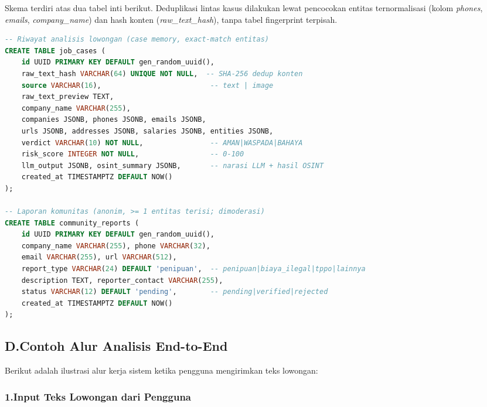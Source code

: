 \documentclass[12pt,a4paper]{article}
\begin{document}
Skema terdiri atas dua tabel inti berikut. Deduplikasi lintas kasus dilakukan lewat pencocokan
entitas ternormalisasi (kolom \textit{phones}, \textit{emails}, \textit{company\_name}) dan hash
konten (\textit{raw\_text\_hash}), tanpa tabel fingerprint terpisah.

\begin{adjustwidth}{0.50cm}{0pt}
\begin{lstlisting}[language=SQL, caption={DDL dua tabel inti Verifin (ringkas)}]
-- Riwayat analisis lowongan (case memory, exact-match entitas)
CREATE TABLE job_cases (
    id UUID PRIMARY KEY DEFAULT gen_random_uuid(),
    raw_text_hash VARCHAR(64) UNIQUE NOT NULL,  -- SHA-256 dedup konten
    source VARCHAR(16),                          -- text | image
    raw_text_preview TEXT,
    company_name VARCHAR(255),
    companies JSONB, phones JSONB, emails JSONB,
    urls JSONB, addresses JSONB, salaries JSONB, entities JSONB,
    verdict VARCHAR(10) NOT NULL,                -- AMAN|WASPADA|BAHAYA
    risk_score INTEGER NOT NULL,                 -- 0-100
    llm_output JSONB, osint_summary JSONB,       -- narasi LLM + hasil OSINT
    created_at TIMESTAMPTZ DEFAULT NOW()
);

-- Laporan komunitas (anonim, >= 1 entitas terisi; dimoderasi)
CREATE TABLE community_reports (
    id UUID PRIMARY KEY DEFAULT gen_random_uuid(),
    company_name VARCHAR(255), phone VARCHAR(32),
    email VARCHAR(255), url VARCHAR(512),
    report_type VARCHAR(24) DEFAULT 'penipuan',  -- penipuan|biaya_ilegal|tppo|lainnya
    description TEXT, reporter_contact VARCHAR(255),
    status VARCHAR(12) DEFAULT 'pending',        -- pending|verified|rejected
    created_at TIMESTAMPTZ DEFAULT NOW()
);
\end{lstlisting}
\end{adjustwidth}

\subsection*{D.\quad Contoh Alur Analisis End-to-End}

Berikut adalah ilustrasi alur kerja sistem ketika pengguna mengirimkan teks lowongan:

\subsubsection*{1.\quad Input Teks Lowongan dari Pengguna}
\end{document}

